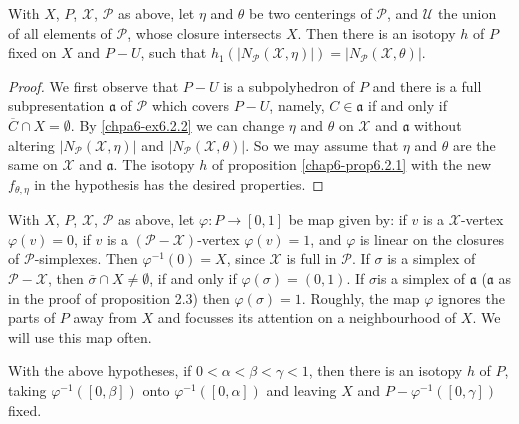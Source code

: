 \begin{proposition}\label{chap6-prop6.2.3}
With $X$, $P$, $\mathscr{X}$, $\mathscr{P}$ as above, let $\eta$ and $\theta$ be two centerings of $\mathscr{P}$, and $\mathcal{U}$ the union of all elements of $\mathscr{P}$, whose closure intersects $X$. Then there is an isotopy $h$ of $P$ fixed on $X$ and $P-U$, such that $h_{1}(|N_{\mathscr{P}}(\mathscr{X},\eta)|)=|N_{\mathscr{P}}(\mathscr{X},\theta)|$.
\end{proposition}

\begin{proof}
We first observe that $P-U$ is a subpolyhedron of $P$ and there is a full subpresentation $\mathfrak{a}$ of $\mathscr{P}$ which covers $P-U$, namely, $C\in\mathfrak{a}$ if and only if $\overline{C}\cap X=\emptyset$. By \ref{chpa6-ex6.2.2} we can change $\eta$ and $\theta$ on $\mathscr{X}$ and $\mathfrak{a}$ without altering $|N_{\mathscr{P}}(\mathscr{X},\eta)|$ and $|N_{\mathscr{P}}(\mathscr{X},\theta)|$. So we may assume that $\eta$ and $\theta$ are the same on $\mathscr{X}$ and $\mathfrak{a}$. The isotopy $h$ of proposition \ref{chap6-prop6.2.1} with the new $f_{\theta,\eta}$ in the hypothesis has the desired properties. 
\end{proof}

With $X$, $P$, $\mathscr{X}$, $\mathscr{P}$ as above, let $\varphi:P\to [0,1]$ be map given by: if $v$ is a $\mathscr{X}$-vertex $\varphi(v)=0$, if $v$ is a $(\mathscr{P}-\mathscr{X})$-vertex $\varphi(v)=1$, and $\varphi$ is linear on the closures of $\mathscr{P}$-simplexes. Then $\varphi^{-1}(0)=X$, since $\mathscr{X}$ is full in $\mathscr{P}$. If $\sigma$ is a simplex of $\mathscr{P}-\mathscr{X}$, then $\overline{\sigma}\cap X\neq \emptyset$, if and only if $\varphi(\sigma)=(0,1)$. If $\sigma$\pageoriginale is a simplex of $\mathfrak{a}$ ($\mathfrak{a}$ as in the proof of proposition 2.3) then $\varphi(\sigma)=1$. Roughly, the map $\varphi$ ignores the parts of $P$ away from $X$ and focusses its attention on a neighbourhood of $X$. We will use this map often.

\begin{proposition}\label{chap6-prop6.2.4}
With the above hypotheses, if $0<\alpha<\beta<\gamma<1$, then there is an isotopy $h$ of $P$, taking $\varphi^{-1}([0,\beta])$ onto $\varphi^{-1}([0,\alpha])$ and leaving $X$ and $P-\varphi^{-1}([0,\gamma])$ fixed.
\end{proposition}


